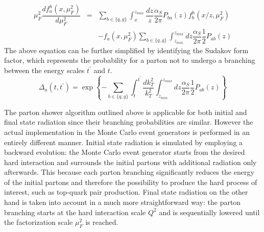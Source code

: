 \begin{eqnarray}
 \mu_{F}^2 \dfrac{d f_{a}^{h}(x,\mu_{F}^{2})}{d \mu_{F}^{2}} & = & \sum_{b \in \{q,g\} } \int_{x}^{z_{max}} \dfrac{dz}{z} \dfrac{\alpha_{S}}{2 \pi} P_{ba}(z) f_{b}^{h}(x/z, \mu_{F}^{2}) \nonumber \\
                                                             &   & - f_{a}(x,\mu_{F}^{2}) \sum_{b \in \{q,g\}} \int_{z_{min}}^{z_{max}} dz \dfrac{\alpha_{S}}{2 \pi} \dfrac{1}{2} P_{ab}(z)
\end{eqnarray}
The above equation can be further simplified by identifying the Sudakov form factor, which represents the probability for a parton not to undergo a branching between the energy scales $t^{'}$ and $t$.
\begin{equation}
 \Delta_{a}(t,t^{'}) = \exp \left\lbrace - \sum_{b \in \{q,g\}} \int_{t}^{t^{'}} \dfrac{dk_{T}^{2}}{k_{T}^{2}} \int_{z_{min}}^{z_{max}} dz \dfrac{\alpha_{S}}{2 \pi} \dfrac{1}{2} P_{ab}(z) \right\rbrace
\end{equation}

The parton shower algorithm outlined above is applicable for both initial and final state radiation since their branching probabilities are similar. However the actual implementation in the Monte Carlo event generators is performed in an entirely different manner. 
Initial state radiation is simulated by employing a backward evolution: the Monte Carlo event generator starts from the desired hard interaction and surrounds the initial partons with additional radiation only afterwards. This because each parton branching significantly reduces the energy of the initial partons and therefore the possibility to produce the hard process of interest, such as top-quark pair production. 
Final state radiation on the other hand is taken into account in a much more straightforward way: the parton branching starts at the hard interaction scale $Q^{2}$ and is sequentially lowered until the factorization scale $\mu_{F}^{2}$ is reached.

